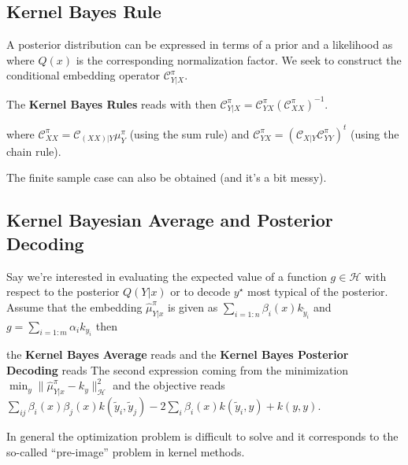 \subsection{Kernel Bayes Rule}
A posterior distribution can be expressed in terms of a prior and a likelihood as
where $Q(x)$ is the corresponding normalization factor. We seek to construct the conditional embedding operator $\mathcal C_{Y|X}^{\pi}$.
\begin{ybox}
The \textbf{Kernel Bayes Rules} reads
with then $\mathcal C^{\pi}_{Y|X}=\mathcal C^{\pi}_{YX}(\mathcal C^{\pi}_{XX})^{-1}$.
\end{ybox}
where $\mathcal C^{\pi}_{XX}=\mathcal C_{(XX)|Y}\mu^{\pi}_{Y}$ (using the sum rule) and $\mathcal C^{\pi}_{YX}=(\mathcal C_{X|Y}\mathcal C^{\pi}_{YY})^{t}$ (using the chain rule).

The finite sample case can also be obtained (and it's a bit messy).

\subsection{Kernel Bayesian Average and Posterior Decoding}
Say we're interested in evaluating the expected value of a function $g\in \mathcal H$ with respect to the posterior $Q(Y|x)$ or to decode $y^{\star}$ most typical of the posterior. Assume that the embedding $\widehat\mu^{\pi}_{Y|x}$ is given as $\sum_{i=1:n} \beta_{i}(x)k_{\tilde y_{i}}$ and $g=\sum_{i=1:m}\alpha_{i}k_{y_{i}}$ then
\begin{ybox}
the \textbf{Kernel Bayes Average} reads
 and the \textbf{Kernel Bayes Posterior Decoding} reads
  The second expression coming from the minimization $\min_{y}\|\widehat \mu^{\pi}_{Y|x}-k_{y}\|_{\mathcal H}^{2}$ and the objective reads $\sum_{ij}\beta_{i}(x)\beta_{j}(x)k(\tilde y_{i},\tilde y_{j})-2\sum_{i}\beta_{i}(x)k(\tilde y_{i},y)+k(y,y)$.
\end{ybox}
In general the optimization problem is difficult to solve and it corresponds to the so-called ``pre-image'' problem in kernel methods.

